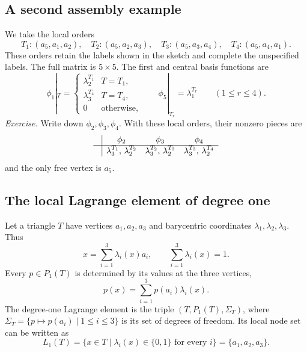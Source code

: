 \documentclass[11pt,a4paper]{article}
\begin{document}
\subsection{A second assembly example}

\begin{center}
\end{center}
We take the local orders
\[
 T_1:(a_5,a_1,a_2),\quad T_2:(a_5,a_2,a_3),\quad
 T_3:(a_5,a_3,a_4),\quad T_4:(a_5,a_4,a_1).
\]
These orders retain the labels shown in the sketch and complete the unspecified labels. The full matrix is \(5\times5\). The first and central basis functions are
\[
 \phi_1|_T=\begin{cases}
  \lambda_2^{T_1} & T=T_1,\\
  \lambda_3^{T_4} & T=T_4,\\
  0 & \text{otherwise},
 \end{cases}
 \qquad
 \phi_5|_{T_r}=\lambda_1^{T_r}\qquad(1\leq r\leq4).
\]
\textit{Exercise.} Write down \(\phi_2,\phi_3,\phi_4\). With these local orders, their nonzero pieces are
\[
\begin{array}{c|ccc}
 &\phi_2&\phi_3&\phi_4\\
\hline
 &\lambda_3^{T_1},\,\lambda_2^{T_2}
 &\lambda_3^{T_2},\,\lambda_2^{T_3}
 &\lambda_3^{T_3},\,\lambda_2^{T_4}
\end{array}
\]
and the only free vertex is \(a_5\).

\subsection{The local Lagrange element of degree one}

Let a triangle \(T\) have vertices \(a_1,a_2,a_3\) and barycentric coordinates \(\lambda_1,\lambda_2,\lambda_3\). Thus
\[
 x=\sum_{i=1}^3\lambda_i(x)a_i,\qquad \sum_{i=1}^3\lambda_i(x)=1 .
\]
Every \(p\in P_1(T)\) is determined by its values at the three vertices,
\[
 p(x)=\sum_{i=1}^3 p(a_i)\lambda_i(x).
\]
The degree-one Lagrange element is the triple \((T,P_1(T),\Sigma_T)\), where \(\Sigma_T=\{p\mapsto p(a_i)\mid 1\le i\le 3\}\) is its set of degrees of freedom. Its local node set can be written as
\[
 L_1(T)=\{x\in T\mid \lambda_i(x)\in\{0,1\}\text{ for every }i\}
       =\{a_1,a_2,a_3\}.
\]
\end{document}
